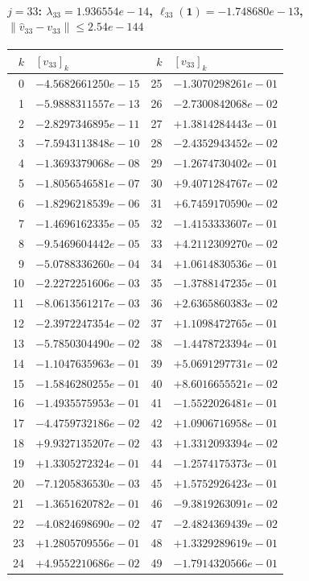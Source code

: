 \documentclass[11pt]{article}
\begin{document}
\paragraph{$j = 33$: $\lambda_{33} = 1.936554e-14$, \quad $\ell_{33}(\mathbf{1}) = -1.748680e-13$, \quad $\|\hat v_{33} - v_{33}\| \leq 2.54e-144$}
\begin{center}
{\footnotesize
\begin{tabular}{r@{\;\;}l@{\quad}r@{\;\;}l}
\toprule
$k$ & $[v_{33}]_k$ & $k$ & $[v_{33}]_k$ \\
\midrule
0 & $-4.5682661250e-15$ & 25 & $-1.3070298261e-01$ \\
1 & $-5.9888311557e-13$ & 26 & $-2.7300842068e-02$ \\
2 & $-2.8297346895e-11$ & 27 & $+1.3814284443e-01$ \\
3 & $-7.5943113848e-10$ & 28 & $-2.4352943452e-02$ \\
4 & $-1.3693379068e-08$ & 29 & $-1.2674730402e-01$ \\
5 & $-1.8056546581e-07$ & 30 & $+9.4071284767e-02$ \\
6 & $-1.8296218539e-06$ & 31 & $+6.7459170590e-02$ \\
7 & $-1.4696162335e-05$ & 32 & $-1.4153333607e-01$ \\
8 & $-9.5469604442e-05$ & 33 & $+4.2112309270e-02$ \\
9 & $-5.0788336260e-04$ & 34 & $+1.0614830536e-01$ \\
10 & $-2.2272251606e-03$ & 35 & $-1.3788147235e-01$ \\
11 & $-8.0613561217e-03$ & 36 & $+2.6365860383e-02$ \\
12 & $-2.3972247354e-02$ & 37 & $+1.1098472765e-01$ \\
13 & $-5.7850304490e-02$ & 38 & $-1.4478723394e-01$ \\
14 & $-1.1047635963e-01$ & 39 & $+5.0691297731e-02$ \\
15 & $-1.5846280255e-01$ & 40 & $+8.6016655521e-02$ \\
16 & $-1.4935575953e-01$ & 41 & $-1.5522026481e-01$ \\
17 & $-4.4759732186e-02$ & 42 & $+1.0906716958e-01$ \\
18 & $+9.9327135207e-02$ & 43 & $+1.3312093394e-02$ \\
19 & $+1.3305272324e-01$ & 44 & $-1.2574175373e-01$ \\
20 & $-7.1205836530e-03$ & 45 & $+1.5752926423e-01$ \\
21 & $-1.3651620782e-01$ & 46 & $-9.3819263091e-02$ \\
22 & $-4.0824698690e-02$ & 47 & $-2.4824369439e-02$ \\
23 & $+1.2805709556e-01$ & 48 & $+1.3329289619e-01$ \\
24 & $+4.9552210686e-02$ & 49 & $-1.7914320566e-01$ \\
\bottomrule
\end{tabular}
}
\end{center}
\end{document}
